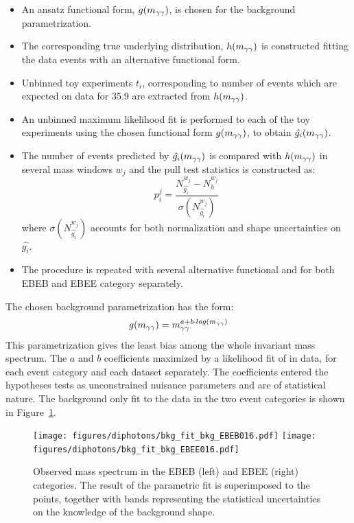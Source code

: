 \begin{itemize}
      \item An ansatz functional form, $g(m_{\gamma\gamma})$, is chosen for the background
        parametrization.
      \item The corresponding true underlying distribution, $h(m_{\gamma\gamma})$ is constructed fitting the
        data events with an alternative functional form.
      \item Unbinned toy experiments $t_{i}$, corresponding to number of events which are expected on data for 35.9 \fbinv
        are extracted from $h(m_{\gamma\gamma})$.
      \item An unbinned maximum likelihood fit is performed to each of the toy experiments using the chosen
        functional form $g(m_{\gamma\gamma})$, to obtain $\hat{g_{i}}(m_{\gamma\gamma})$.
      \item The number of events predicted by $\hat{g_{i}}(m_{\gamma\gamma})$ is compared with $h(m_{\gamma\gamma})$
        in several mass windows $w_{j}$ and the pull test statistics is constructed as:
        $$ p^{j}_{i} = \frac{ N^{w_j}_{\hat{g_i}} - N^{w_j}_{h} } { \sigma(N^{w_j}_{\hat{g_i}}) } $$
        where $\sigma(N^{w_j}_{\hat{g_i}})$ accounts for both normalization and shape
        uncertainties on $\hat{g_i}$.
      \item The procedure is repeated with several alternative functional and for both EBEB and EBEE category separately.
\end{itemize}

The chosen background parametrization has the form:
\begin{equation}
  g(m_{\gamma\gamma}) = m_{\gamma\gamma}^{a+b \cdot log(m_{\gamma\gamma})}
\end{equation}
\label{eq:bkg_dijet}
This parametrization gives the least bias among the whole invariant mass spectrum.
The $a$ and $b$ coefficients maximized by a likelihood fit of \mgg in data, for each event category and each dataset separately. The coefficients entered the hypotheses tests as unconstrained nuisance parameters and are of statistical
nature.
The background only fit to the data in the two event categories is shown in Figure~\ref{fig:bkg_fits}.

\begin{figure}
  \centering
  \texttt{[image: figures/diphotons/bkg\_fit\_bkg\_EBEB016.pdf]}
  \texttt{[image: figures/diphotons/bkg\_fit\_bkg\_EBEE016.pdf]}  
  \caption{Observed mass spectrum in the EBEB (left) and EBEE (right) categories. The result of the parametric fit is
    superimposed to the points, together with bands representing the statistical uncertainties on
    the knowledge of the background shape.}
  \label{fig:bkg_fits}
\end{figure}


